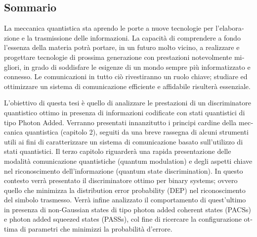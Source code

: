 
\begin{otherlanguage}{italian}
\chapter*{Sommario}
    La meccanica quantistica sta aprendo le porte a nuove tecnologie per l'elaborazione e 
    la trasmissione delle informazioni. La capacità di comprendere a fondo l'essenza della materia potrà portare, 
    in un futuro molto vicino, a realizzare e progettare tecnologie di prossima generazione
    con prestazioni notevolmente migliori, in grado di soddisfare le esigenze di un mondo sempre
    più informatizzato e connesso.
    Le comunicazioni in tutto ciò rivestiranno un ruolo chiave; studiare ed ottimizzare un sistema
    di comunicazione efficiente e affidabile risulterà essenziale.

    L'obiettivo di questa tesi è quello di analizzare le prestazioni di un discriminatore quantistico ottimo 
    in presenza di informazioni codificate con stati quantistici di tipo \foreignlanguage{english}{Photon Added}. 
    Verranno presentati innanzitutto i principi cardine della meccanica quantistica (capitolo 2), 
    seguiti da una breve rassegna di alcuni strumenti utili ai fini di 
    caratterizzare un sistema di comunicazione basato sull'utilizzo di stati quantistici.
    Il terzo capitolo riguarderà una rapida presentazione delle modalità comunicazione quantistiche (\foreignlanguage{english}{quantum modulation})
    e degli aspetti chiave nel riconoscimento dell'informazione (\foreignlanguage{english}{quantum state discrimination}). In questo contesto 
    verrà presentato il discriminatore ottimo per \foreignlanguage{english}{binary systems}; ovvero quello che minimizza la \foreignlanguage{english}{distribution error
    probability} (DEP) nel riconoscimento del simbolo trasmesso. 
    Verrà infine analizzato il comportamento di quest'ultimo in presenza di \foreignlanguage{english}{non-Gaussian states} di tipo \foreignlanguage{english}{photon
    added coherent states} (PACSs) e \foreignlanguage{english}{photon added squeezed states} (PASSs), col fine di ricercare la configurazione
    ottima di parametri che minimizzi la probabilità d'errore.
\end{otherlanguage}